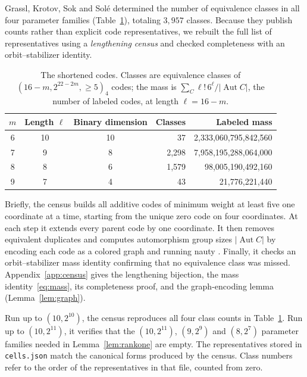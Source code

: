 \documentclass[11pt]{article}
\theoremstyle{definition}
\theoremstyle{remark}
\newcommand{\Aut}{\operatorname{Aut}}
\newcommand{\pathcode}[1]{{\small\nolinkurl{#1}}}
\begin{document}
Grassl, Krotov, Sok and Sol\'e \cite[Table~1]{dodeca} determined the
number of equivalence classes in all four parameter families
(Table~\ref{tab:classes}), totaling \(3{,}957\) classes. Because they
publish counts rather than explicit code representatives, we rebuilt the
full list of representatives using a \emph{lengthening census} and
checked completeness with an orbit--stabilizer identity.

\begin{table}[htbp]
\centering\small
\caption{The shortened codes. Classes are equivalence classes of
\((16-m,2^{22-2m},{\geq}5)_4\) codes; the mass is
\(\sum_C \ell!\,6^\ell/|\Aut C|\), the number of labeled codes, at
length \(\ell=16-m\).}\label{tab:classes}
\begin{tabular}{@{}cccrr@{}}\toprule
\(m\)&Length \(\ell\)&Binary dimension&Classes&Labeled mass\\\midrule
6&10&10&37&2,333,060,795,842,560\\
7&9&8&2,298&7,958,195,288,064,000\\
8&8&6&1,579&98,005,190,492,160\\
9&7&4&43&21,776,221,440\\\bottomrule
\end{tabular}
\end{table}

Briefly, the census builds all additive codes of minimum weight at least
five one coordinate at a time, starting from the unique zero code on
four coordinates. At each step it extends every parent code by one
coordinate. It then removes equivalent duplicates and computes
automorphism group sizes \(|\Aut C|\) by encoding each code as a colored
graph and running nauty \cite{nauty}. Finally, it checks an
orbit--stabilizer mass identity confirming that no equivalence class was
missed. Appendix~\ref{app:census} gives the lengthening bijection, the
mass identity~\eqref{eq:mass}, its completeness proof, and the
graph-encoding lemma (Lemma~\ref{lem:graph}).

Run up to \((10,2^{10})\), the census reproduces all four class counts
in Table~\ref{tab:classes}. Run up to \((10,2^{11})\), it verifies that
the \((10,2^{11})\), \((9,2^9)\) and \((8,2^7)\) parameter families
needed in Lemma~\ref{lem:rankone} are empty. The representatives stored
in \pathcode{cells.json} match the canonical forms produced by the
census. Class numbers refer to the order of the representatives in that
file, counted from zero.

\end{document}

